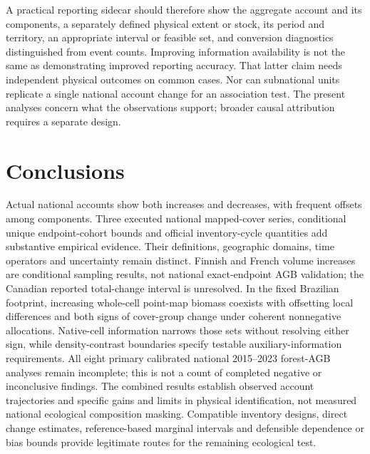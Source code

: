 \documentclass[11pt,a4paper]{article}
\begin{document}
A practical reporting sidecar should therefore show the aggregate account and its components, a separately defined physical extent or stock, its period and territory, an appropriate interval or feasible set, and conversion diagnostics distinguished from event counts. Improving information availability is not the same as demonstrating improved reporting accuracy. That latter claim needs independent physical outcomes on common cases. Nor can subnational units replicate a single national account change for an association test. The present analyses concern what the observations support; broader causal attribution requires a separate design.

\section{Conclusions}
Actual national accounts show both increases and decreases, with frequent offsets among components. Three executed national mapped-cover series, conditional unique endpoint-cohort bounds and official inventory-cycle quantities add substantive empirical evidence. Their definitions, geographic domains, time operators and uncertainty remain distinct. Finnish and French volume increases are conditional sampling results, not national exact-endpoint AGB validation; the Canadian reported total-change interval is unresolved. In the fixed Brazilian footprint, increasing whole-cell point-map biomass coexists with offsetting local differences and both signs of cover-group change under coherent nonnegative allocations. Native-cell information narrows those sets without resolving either sign, while density-contrast boundaries specify testable auxiliary-information requirements. All eight primary calibrated national 2015--2023 forest-AGB analyses remain incomplete; this is not a count of completed negative or inconclusive findings. The combined results establish observed account trajectories and specific gains and limits in physical identification, not measured national ecological composition masking. Compatible inventory designs, direct change estimates, reference-based marginal intervals and defensible dependence or bias bounds provide legitimate routes for the remaining ecological test.
\end{document}
